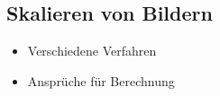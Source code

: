 \subsection{Skalieren von Bildern}
\begin{itemize}
\item Verschiedene Verfahren
\item Ansprüche für Berechnung
\end{itemize}